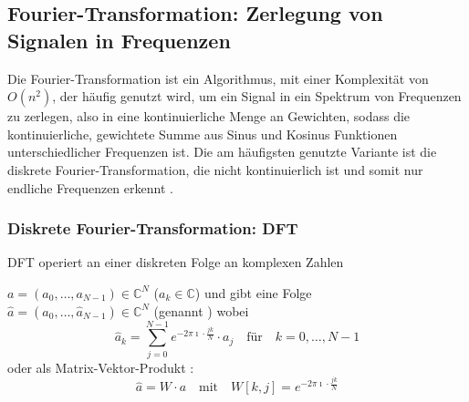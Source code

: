 \subsection{Fourier-Transformation: Zerlegung von Signalen in Frequenzen}
Die Fourier-Transformation ist ein Algorithmus, mit einer Komplexität von \(O\left(n^2\right) \), der häufig genutzt wird, um ein Signal in ein Spektrum von Frequenzen zu zerlegen, also in eine kontinuierliche Menge an Gewichten, sodass die kontinuierliche, gewichtete Summe aus Sinus und Kosinus Funktionen unterschiedlicher Frequenzen ist. Die am häufigsten genutzte Variante ist die diskrete Fourier-Transformation, die nicht kontinuierlich ist und somit nur endliche Frequenzen erkennt \cite{don_h_johnson_58_2017}.

\subsubsection{Diskrete Fourier-Transformation: DFT}\label{sec:DFT}
DFT operiert an einer diskreten Folge an komplexen Zahlen

\(a = (a_0,\dots,a_{N-1}) \in \mathbb{C}^N\) (\(a_k \in \mathbb{C}\)) und gibt eine Folge\\
\(\hat{a} = (\hat{a}_0,\dots,\hat{a}_{N-1}) \in \mathbb{C}^N\) (genannt )
wobei \[\hat{a}_k = \sum_{j=0}^{N-1}e^{-2\pi \imath\cdot\frac{jk}{N}}\cdot a_j \quad \text{für}\quad k = 0,\dots,N-1\] oder als Matrix-Vektor-Produkt \cite{noauthor_diskrete_2024}:
\[\hat{a} = W\cdot a \quad \text{mit} \quad W[k,j] = e^{-2\pi \imath \cdot\frac{jk}{N}}\]

